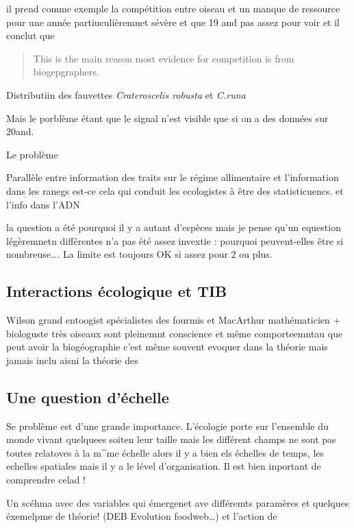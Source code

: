 il prend comme exemple la compétition entre oiseau et un manque de
ressource pour une année partiuculièremnet sévère et que 19 and pas
assez pour voir et il conclut que

\begin{quote}
This is the main reason most evidence for competition is from
biogepgraphers.
\end{quote}

Distributiin des fauvettes \emph{Crateroscelis robusta} et \emph{C.runa}

Mais le porblème étant que le signal n'est visible que si on a des
données sur 20and.

Le problème

Parallèle entre information des traits sur le régime allimentaire et
l'information dans les ranegs est-ce cela qui conduit les ecologistes à
être des statisticuencs. et l'info dans l'ADN

la question a été pourquoi il y a autant d'espèces mais je pense qu'un
equestion légèremnetn différentes n'a pas été assez invextie : pourquoi
peuvent-elles être si nombreuse\ldots{}. La limite est toujours OK si
assez pour 2 ou plus.

\subsection{Interactions écologique et
TIB}\label{interactions-uxe9cologique-et-tib}

Wilson grand entoogist spécialistes des fourmis et MacArthur
mathématicien + biologuste très oiseaux sont pleinemnt conscience et
même comporteemntau que peut avoir la biogéographie c'est même souvent
evoquer dans la théorie mais jamais inclu aisni la théorie des

\subsection{Une question d'échelle}\label{une-question-duxe9chelle}

Se problème est d'une grande importance. L'écologie porte sur l'ensemble
du monde vivant quelquees soiten leur taille mais les différent champs
ne sont pas toutes relatoves à la m\^{}me échelle alors il y a bien els
échelles de temps, les echelles spatiales mais il y a le lével
d'organisation. Il est bien inportant de comprendre celad !

Un scéhma avec des variables qui émergenet ave différemts paramères et
quelques éxemelpme de théorie! (DEB Evolution foodweb\ldots{}) et
l'action de

